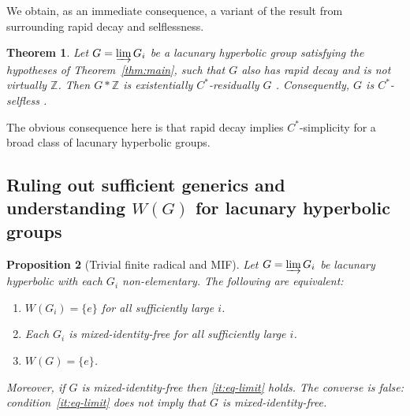 \documentclass[12pt]{amsart}
\theoremstyle{plain}
\newtheorem{theorem}{Theorem}[section]
\newtheorem{proposition}[theorem]{Proposition}
\theoremstyle{definition}
\newcommand{\Z}{\mathbb{Z}}
\newcommand{\Cstar}{C^*}
\begin{document}
We obtain, as an immediate consequence, a variant of the result from \cite{AGKE} surrounding rapid decay and selflessness.

\begin{theorem}\label{thm:ecr}
Let $G = \varinjlim G_i$ be a lacunary hyperbolic group satisfying the hypotheses of
Theorem~\ref{thm:main}, such that $G$ also has rapid decay and is not virtually $\Z$.
Then $G\ast \Z$ is existentially $\Cstar$-residually $G$ \cite[Theorem~3.5]{AGKE}.
Consequently, $G$ is $\Cstar$-selfless \cite[Corollary~3.8]{AGKE}.
\end{theorem}

The obvious consequence here is that rapid decay implies $\Cstar$-simplicity for a broad class of lacunary hyperbolic groups.

\subsection{Ruling out sufficient generics and understanding $W(G)$ for lacunary hyperbolic groups}

\begin{proposition}[Trivial finite radical and MIF]\label{prop:equiv}
Let $G = \varinjlim G_i$ be lacunary hyperbolic with each $G_i$ non-elementary.
The following are equivalent:
\begin{enumerate}[label=(\alph*)]
  \item\label{it:eq-approx} $W(G_i) = \{e\}$ for all sufficiently large $i$.
  \item\label{it:eq-mif-approx} Each $G_i$ is mixed-identity-free for all sufficiently large $i$.
  \item\label{it:eq-limit} $W(G) = \{e\}$.
\end{enumerate}
Moreover, if $G$ is mixed-identity-free then \ref{it:eq-limit} holds.
The converse is false: condition~\ref{it:eq-limit} does not imply that $G$ is mixed-identity-free.
\end{proposition}
\end{document}

